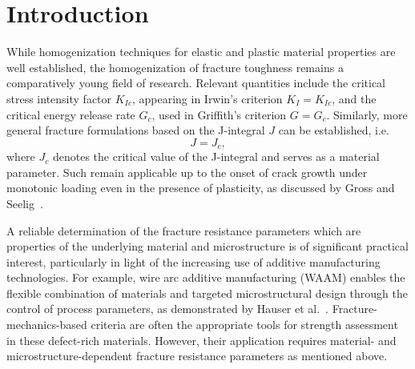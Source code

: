 \documentclass[pdflatex,sn-mathphys-num]{sn-jnl}%
\theoremstyle{thmstyleone}%
\theoremstyle{thmstyletwo}%
\theoremstyle{thmstylethree}%
\begin{document}
\section{Introduction}\label{sec:intro}

While homogenization techniques for elastic and plastic material properties are well established,
the homogenization of fracture toughness remains a comparatively young field of research.
Relevant quantities include the critical stress intensity factor \( K_{Ic} \),
appearing in Irwin’s criterion \( K_I = K_{Ic} \), and the critical energy release rate \( G_c \),
used in Griffith’s criterion \( G = G_c \).
Similarly,  more general fracture formulations based on the J-integral $J$ can be established, i.e.
\begin{equation}
    J = J_c,
    \label{eq:fracture_criterion_J}
\end{equation}
where \( J_c \) denotes the critical value of the J-integral and serves as a material parameter.
Such 
remain applicable up to the onset of crack growth under monotonic loading even
in the presence of plasticity, as discussed by Gross and Seelig~\cite{gross_fracture_2011}.



A reliable determination of the fracture resistance parameters which are properties of the 
underlying material and microstructure is of significant
practical interest, particularly in light of the increasing use of
additive manufacturing technologies. For example, wire arc additive manufacturing (WAAM) enables the flexible combination of materials
and targeted microstructural design through the control of process parameters,
as demonstrated by Hauser et al.~\cite{hauser_porosity_2021}. Fracture-mechanics-based criteria are often the appropriate tools
for strength assessment in these defect-rich materials.
However, their application requires material- and microstructure-dependent
fracture resistance parameters as mentioned above.
\end{document}
